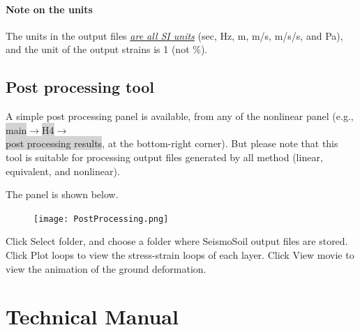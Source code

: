 \documentclass[11pt,letterpaper]{article}
\newcommand{\panel}[1]{\colorbox{lightgray}{\textsf{#1}}}
\begin{document}
\paragraph{Note on the units} The units in the output files \emph{\underline{are all SI units}} (sec, Hz, m, m/s, m/s/s, and Pa), and the unit of the output strains is 1 (not \%).

\newpage
\subsection{Post processing tool}
A simple post processing panel is available, from any of the nonlinear panel (e.g., \panel{main}$\rightarrow$\panel{H4}$\rightarrow$\\\panel{post processing results}, at the bottom-right corner). But please note that this tool is suitable for processing output files generated by all method (linear, equivalent, and nonlinear).

The panel is shown below.

\begin{figure}[H]
	\centering
	\texttt{[image: PostProcessing.png]}\\
\end{figure}

Click \textsf{Select folder}, and choose a folder where SeismoSoil output files are stored. Click \textsf{Plot loops} to view the stress-strain loops of each layer. Click \textsf{View movie} to view the animation of the ground deformation.

\begin{figure}[H]
	\centering
\end{figure}

\newpage
\section{Technical Manual}\label{sec:manual}
\end{document}
